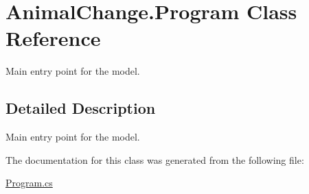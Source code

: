 \hypertarget{class_animal_change_1_1_program}{}\section{Animal\+Change.\+Program Class Reference}
\label{class_animal_change_1_1_program}


Main entry point for the model.  




\subsection{Detailed Description}
Main entry point for the model. 

The documentation for this class was generated from the following file\+:\begin{DoxyCompactItemize}
\item 
\mbox{\hyperlink{_program_8cs}{Program.\+cs}}\end{DoxyCompactItemize}
